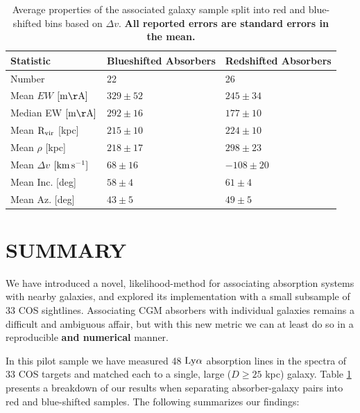 \documentclass[twocolumn,tighten]{aastex6}
\begin{document}
\begin{table}[b]\footnotesize
\begin{center}
\begin{tabular}{l l l}
 \hline \hline
 Statistic                				&  Blueshifted Absorbers   &     Redshifted Absorbers     \\ 
  \hline \hline
 Number 	          			 		&     	22				&	26			\\
 Mean $EW$    \scriptsize $\rm [m\AA]$    &	$329 \pm 52$ 		&	$245 \pm 34$  	\\
 Median EW     \scriptsize $\rm [m\AA]$    & 	$292 \pm 16$		& 	$177 \pm 10$	\\
 Mean $\rm R_{vir}$   \scriptsize [kpc]	&   	$215 \pm 10$		& 	$224 \pm 10$	\\
 Mean $\rho$   \scriptsize [kpc]          		&   	$218 \pm 17$ 		& 	$298 \pm 23$	\\
 Mean $\Delta v$  \scriptsize $\rm [km\, s^{-1}]$     &	$ 68 \pm 16$    &	$-108 \pm 20$	\\
 Mean Inc.  \scriptsize [deg]  			&  	$58 \pm 4$		&	$61 \pm 4$	\\
 Mean Az.  \scriptsize [deg]    			&	$43 \pm 5$ 		&	$49 \pm 5$ 	\\
  
\hline
\end{tabular}
\end{center}
  \caption{\small{Average properties of the associated galaxy sample split into red and blue-shifted bins based on $\Delta v$. \textbf{All reported errors are standard errors in the mean.}}}
  \label{resultsTable}
\end{table}

\vspace{5pt}

\section{SUMMARY}

We have introduced a novel, likelihood-method for associating absorption systems with nearby galaxies, and explored its implementation with a small subsample of 33 COS sightlines. Associating CGM absorbers with individual galaxies remains a difficult and ambiguous affair, but with this new metric we can at least do so in a reproducible \textbf{and numerical} manner. 

In this pilot sample we have measured 48 $\rm Ly\alpha$ absorption lines in the spectra of 33 COS targets and matched each to a single, large ($D\geq 25$ kpc) galaxy. Table \ref{resultsTable} presents a breakdown of our results when separating absorber-galaxy pairs into red and blue-shifted samples. The following summarizes our findings:
\end{document}
